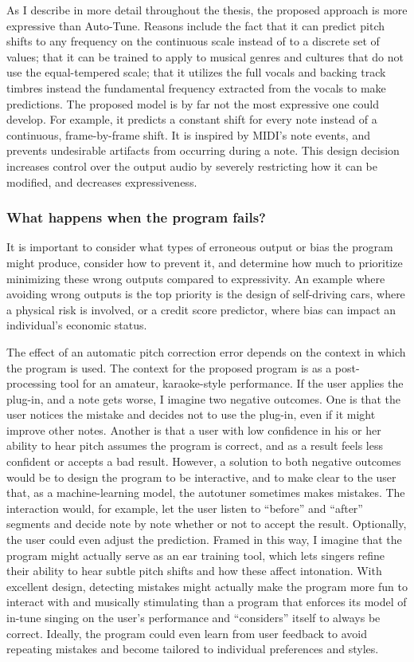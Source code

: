 As I describe in more detail throughout the thesis, the proposed approach is more expressive than Auto-Tune. Reasons include the fact that it can predict pitch shifts to any frequency on the continuous scale instead of to a discrete set of values; that it can be trained to apply to musical genres and cultures that do not use the equal-tempered scale; that it utilizes the full vocals and backing track timbres instead the fundamental frequency extracted from the vocals to make predictions. The proposed model is by far not the most expressive one could develop. For example, it predicts a constant shift for every note instead of a continuous, frame-by-frame shift. It is inspired by MIDI's note events, and prevents undesirable artifacts from occurring during a note. This design decision increases control over the output audio by severely restricting how it can be modified, and decreases expressiveness. 

\subsubsection{What happens when the program fails?}
It is important to consider what types of erroneous output or bias the program might produce, consider how to prevent it, and determine how much to prioritize minimizing these wrong outputs compared to expressivity. An example where avoiding wrong outputs is the top priority is the design of self-driving cars, where a physical risk is involved, or a credit score predictor, where bias can impact an individual's economic status. 

The effect of an automatic pitch correction error depends on the context in which the program is used. The context for the proposed program is as a post-processing tool for an amateur, karaoke-style performance. If the user applies the plug-in, and a note gets worse, I imagine two negative outcomes. One is that the user notices the mistake and decides not to use the plug-in, even if it might improve other notes. Another is that a user with low confidence in his or her ability to hear pitch assumes the program is correct, and as a result feels less confident or accepts a bad result. However, a solution to both negative outcomes would be to design the program to be interactive, and to make clear to the user that, as a machine-learning model, the autotuner sometimes makes mistakes. The interaction would, for example, let the user listen to ``before'' and ``after'' segments and decide note by note whether or not to accept the result. Optionally, the user could even adjust the prediction. Framed in this way, I imagine that the program might actually serve as an ear training tool, which lets singers refine their ability to hear subtle pitch shifts and how these affect intonation. With excellent design, detecting mistakes might actually make the program more fun to interact with and musically stimulating than a program that enforces its model of in-tune singing on the user's performance and ``considers'' itself to always be correct. Ideally, the program could even learn from user feedback to avoid repeating mistakes and become tailored to individual preferences and styles.

